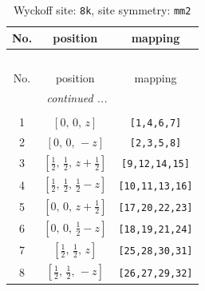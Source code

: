 \documentclass[fleqn,8pt]{jsarticle}
\begin{document}
\begin{longtable}{ccc}
\caption{Wyckoff site: {\tt 8k}, site symmetry: {\tt mm2}}
 \\
 \hline \hline
No. & position & mapping \\ \hline \endfirsthead

\multicolumn{2}{l}{\tablename\ \thetable{}} \\
 \hline \hline
No. & position & mapping \\ \hline \endhead

 \hline \hline
\multicolumn{2}{r}{\footnotesize\it continued ...} \\ \endfoot

 \hline \hline
\multicolumn{2}{r}{} \\ \endlastfoot

1 & $\left[ 0,\, 0,\, z \right]$ & {\tt [1,4,6,7]} \\ \hline
2 & $\left[ 0,\, 0,\, - z \right]$ & {\tt [2,3,5,8]} \\ \hline
3 & $\left[ \frac{1}{2},\, \frac{1}{2},\, z + \frac{1}{2} \right]$ & {\tt [9,12,14,15]} \\ \hline
4 & $\left[ \frac{1}{2},\, \frac{1}{2},\, \frac{1}{2} - z \right]$ & {\tt [10,11,13,16]} \\ \hline
5 & $\left[ 0,\, 0,\, z + \frac{1}{2} \right]$ & {\tt [17,20,22,23]} \\ \hline
6 & $\left[ 0,\, 0,\, \frac{1}{2} - z \right]$ & {\tt [18,19,21,24]} \\ \hline
7 & $\left[ \frac{1}{2},\, \frac{1}{2},\, z \right]$ & {\tt [25,28,30,31]} \\ \hline
8 & $\left[ \frac{1}{2},\, \frac{1}{2},\, - z \right]$ & {\tt [26,27,29,32]} \\
\end{longtable}
\renewcommand{\arraystretch}{1.2}
\end{document}
